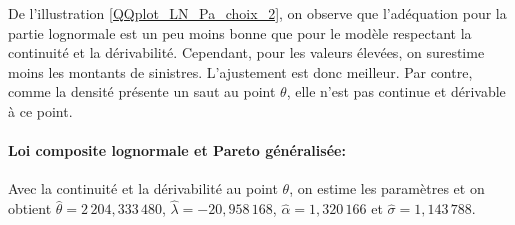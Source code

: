 		De l'illustration \ref{QQplot_LN_Pa_choix_2}, on observe que l'adéquation pour la partie lognormale est un peu moins bonne que pour le modèle respectant la continuité et la dérivabilité. Cependant, pour les valeurs élevées, on surestime moins les montants de sinistres. L'ajustement est donc meilleur. Par contre, comme la densité présente un saut au point $\theta$, elle n'est pas continue et dérivable à ce point. 
		
		\paragraph{Loi composite lognormale et Pareto généralisée:} Avec la continuité et la dérivabilité au point $\theta$, on estime les paramètres et on obtient $\hat{\theta} =2\,204,333\,480$, $\hat{\lambda}=-20,958\,168$, $\hat{\alpha} =1,320\,166$ et $\hat{\sigma}= 1,143\,788$.
	
